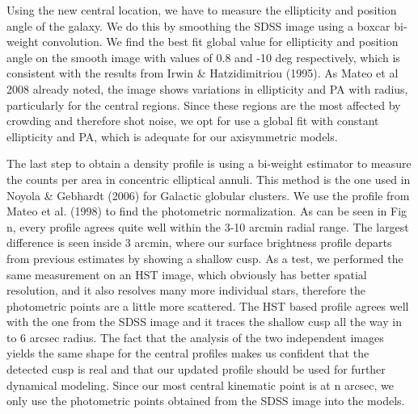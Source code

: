 \documentclass[%
 aip,
 twocolumn,
 jmp,%
 amsmath,amssymb,
 reprint,%
]{aastex61}
\begin{document}
Using the new central location, we have to measure the ellipticity and position angle of the galaxy. We do this by smoothing the SDSS image using a boxcar bi-weight convolution. We find the best fit global value for ellipticity and position angle on the smooth image with values of 0.8 and -10 deg respectively, which is consistent with the results from Irwin & Hatzidimitriou (1995). As Mateo et al 2008 already noted, the image shows variations in ellipticity and PA with radius, particularly for the central regions. Since these regions are the most affected by crowding and therefore shot noise, we opt for use a global fit with constant ellipticity and PA, which is adequate for our axisymmetric models.

The last step to obtain a density profile is using a bi-weight estimator to measure the counts per area in concentric elliptical annuli. This method is the one used in Noyola \& Gebhardt (2006) for Galactic globular clusters. We use the profile from Mateo et al. (1998) to find the photometric normalization. As can be seen in Fig n, every profile agrees quite well within the 3-10 arcmin radial range. The largest difference is seen inside 3 arcmin, where our surface brightness profile departs from previous estimates by showing a shallow cusp. As a test, we performed the same measurement on an HST image, which obviously has better spatial resolution, and it also resolves many more individual stars, therefore the photometric points are a little more scattered. The HST based profile agrees well with the one from the SDSS image and it traces the shallow cusp all the way in  to 6 arcsec radius. The fact that the analysis of the two independent images yields the same shape for the central profiles makes us confident that the detected cusp is real and that our updated profile should be used for further dynamical modeling. Since our most central kinematic point is at n arcsec, we only use the photometric points obtained from the SDSS image into the models.
\end{document}

